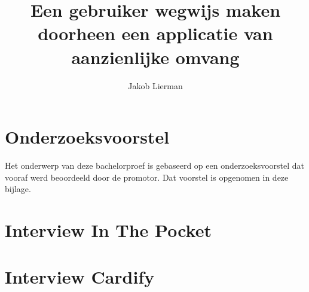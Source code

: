 \documentclass{bachproef-tin}
\title{Een gebruiker wegwijs maken doorheen een applicatie van aanzienlijke omvang}
\author{Jakob Lierman}
\begin{document}
\inserttitlepage

\usechapterimagefalse



\pagestyle{empty}
\tableofcontents
\cleardoublepage
\pagestyle{fancy}


\listoffigures
\listoftables
\printacronyms












\appendix
\renewcommand{\chaptername}{Appendix}


\chapter{Onderzoeksvoorstel}

Het onderwerp van deze bachelorproef is gebaseerd op een onderzoeksvoorstel dat vooraf werd beoordeeld door de promotor. Dat voorstel is opgenomen in deze bijlage.




\chapter{Interview In The Pocket}
\label{bijlage:interview-itp}



\chapter{Interview Cardify}
\label{bijlage:interview-cardify}
\end{document}
